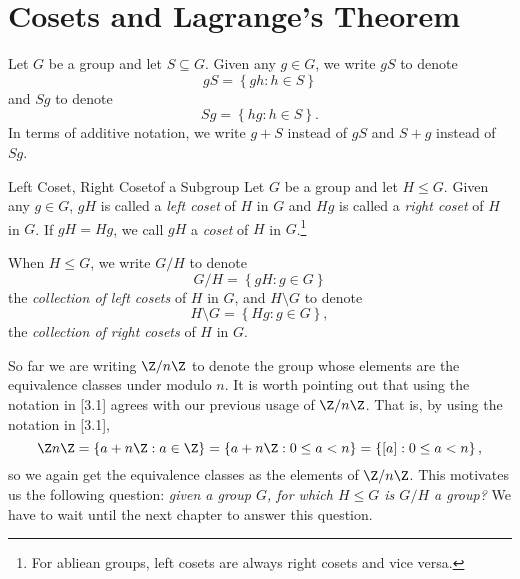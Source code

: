 \documentclass[pmath347]{subfiles}
\begin{document}

    \section{Cosets and Lagrange's Theorem}

    \np Let $G$ be a group and let $S\subseteq G$. Given any $g\in G$, we write $gS$ to denote
    \begin{equation*}
        gS = \left\lbrace gh:h\in S \right\rbrace 
    \end{equation*}
    and $Sg$ to denote
    \begin{equation*}
        Sg = \left\lbrace hg: h\in S \right\rbrace .
    \end{equation*}
    In terms of additive notation, we write $g+S$ instead of $gS$ and $S+g$ instead of $Sg$.

    \begin{definition}{Left Coset, Right Coset}{of a Subgroup}
        Let $G$ be a group and let $H\leq G$. Given any $g\in G$, $gH$ is called a \emph{left coset} of $H$ in $G$ and $Hg$ is called a \emph{right coset} of $H$ in $G$. If $gH=Hg$, we call $gH$ a \emph{coset} of $H$ in $G$.\footnote{For abliean groups, left cosets are always right cosets and vice versa.}
    \end{definition}

    \noindent When $H\leq G$, we write $G / H$ to denote
    \begin{equation}
        G / H = \left\lbrace gH:g\in G \right\rbrace 
    \end{equation}
    the \textit{collection of left cosets} of $H$ in $G$, and $H\setminus G$ to denote
    \begin{equation*}
        H\setminus G = \left\lbrace Hg: g\in G \right\rbrace ,
    \end{equation*}
    the \textit{collection of right cosets} of $H$ in $G$.

    \np[$\Z /n\Z$]So far we are writing $\Z /n\Z$ to denote the group whose elements are the equivalence classes under modulo $n$. It is worth pointing out that using the notation in [3.1] agrees with our previous usage of $\Z /n\Z$. That is, by using the notation in [3.1],
    \begin{equation*}
        \Z n\Z = \left\lbrace a+n\Z:a\in\Z \right\rbrace = \left\lbrace a+n\Z:0\leq a<n \right\rbrace = \left\lbrace \left[ a \right] : 0\leq a<n \right\rbrace ,
    \end{equation*}
    so we again get the equivalence classes as the elements of $\Z /n\Z$. This motivates us the following question: \textit{given a group $G$, for which $H\leq G$ is $G / H$ a group?} We have to wait until the next chapter to answer this question.
\end{document}
